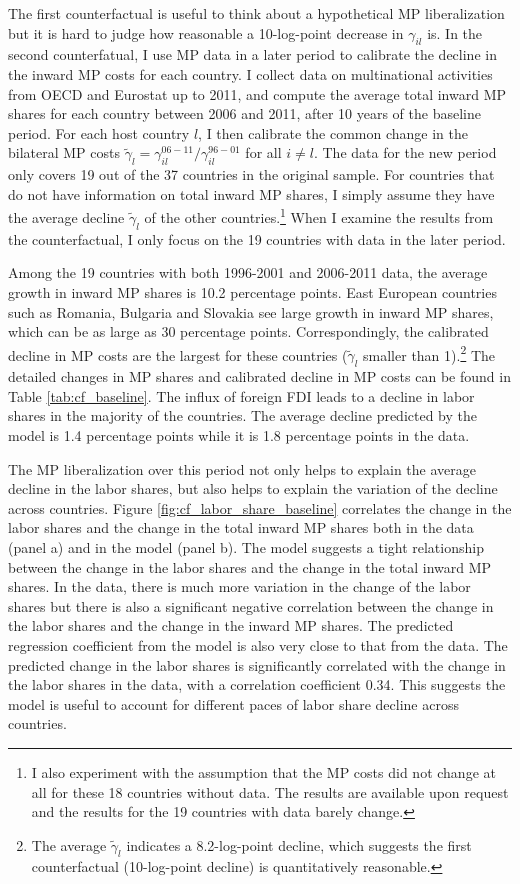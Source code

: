 \documentclass[notitlepage,11pt]{article}%
\begin{document}
The first counterfactual is useful to think about a hypothetical MP
liberalization but it is hard to judge how reasonable a 10-log-point decrease
in $\gamma_{il}$ is. In the second counterfatual, I use MP data in a later
period to calibrate the decline in the inward MP costs for each country. I
collect data on multinational activities from OECD and Eurostat up to 2011,
and compute the average total inward MP shares for each country between 2006
and 2011, after 10 years of the baseline period. For each host country $l$, I
then calibrate the common change in the bilateral MP costs $\tilde{\gamma}%
_{l}=\gamma_{il}^{06-11}/\gamma_{il}^{96-01}$ for all $i\neq l$. The data for
the new period only covers 19 out of the 37 countries in the original sample.
For countries that do not have information on total inward MP shares, I simply
assume they have the average decline $\tilde{\gamma}_{l}$ of the other
countries.\footnote{I also experiment with the assumption that the MP costs
did not change at all for these 18 countries without data. The results are
available upon request and the results for the 19 countries with data barely
change.} When I examine the results from the counterfactual, I only focus on
the 19 countries with data in the later period.

Among the 19 countries with both 1996-2001 and 2006-2011 data, the average
growth in inward MP shares is 10.2 percentage points. East European countries
such as Romania, Bulgaria and Slovakia see large growth in inward MP shares,
which can be as large as 30 percentage points. Correspondingly, the calibrated
decline in MP costs are the largest for these countries ($\tilde{\gamma}_{l}$
smaller than 1).\footnote{The average $\tilde{\gamma}_{l}$ indicates a
8.2-log-point decline, which suggests the first counterfactual (10-log-point
decline) is quantitatively reasonable.} The detailed changes in MP shares and
calibrated decline in MP costs can be found in Table \ref{tab:cf_baseline}.
The influx of foreign FDI leads to a decline in labor shares in the majority
of the countries. The average decline predicted by the model is 1.4 percentage
points while it is 1.8 percentage points in the data.

The MP liberalization over this period not only helps to explain the average
decline in the labor shares, but also helps to explain the variation of the
decline across countries. Figure \ref{fig:cf_labor_share_baseline} correlates
the change in the labor shares and the change in the total inward MP shares
both in the data (panel a) and in the model (panel b). The model suggests a
tight relationship between the change in the labor shares and the change in
the total inward MP shares. In the data, there is much more variation in the
change of the labor shares but there is also a significant negative
correlation between the change in the labor shares and the change in the
inward MP shares. The predicted regression coefficient from the model is also
very close to that from the data. The predicted change in the labor shares is
significantly correlated with the change in the labor shares in the data, with
a correlation coefficient 0.34. This suggests the model is useful to account
for different paces of labor share decline across countries.%
\end{document}
